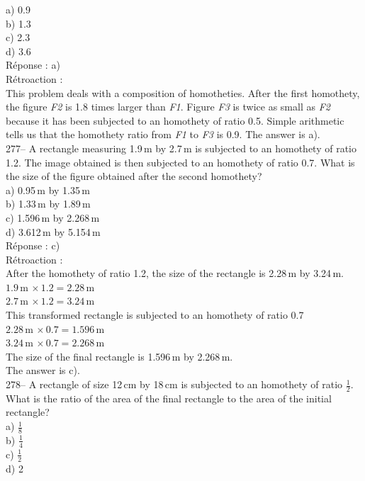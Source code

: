 \documentclass[letterpaper, 12pt]{article}
\begin{document}
a) 0.9\\
b) 1.3\\
c) 2.3\\
d) 3.6\\

R\'eponse : a)\\

R\'etroaction : \\
This problem deals with a composition of homotheties. After the
first homothety, the figure \emph{F2} is 1.8 times larger than
\emph{F1}. Figure \emph{F3} is twice as small as \emph{F2} because
it has been subjected to an homothety of ratio 0.5. Simple
arithmetic tells us that the
homothety ratio from \emph{F1} to \emph{F3} is 0.9. The answer is a).\\

277-- A rectangle measuring 1.9\,m by 2.7\,m is subjected to an
homothety of ratio 1.2. The image obtained is then subjected to an
homothety of ratio 0.7. What is the size of the figure obtained
after the second homothety?\\


a) 0.95\,m by 1.35\,m\\
b) 1.33\,m by 1.89\,m\\
c) 1.596\,m by 2.268\,m\\
d) 3.612\,m by 5.154\,m\\

R\'eponse : c)\\

R\'etroaction : \\
After the homothety of ratio 1.2, the size of the rectangle is
2.28\,m by 3.24\,m.\\
$1.9$\,m $\times\,1.2=2.28$\,m\\
$2.7$\,m $\times\,1.2=3.24$\,m\\
This transformed rectangle is subjected to an homothety of ratio
0.7\\
$2.28$\,m $\times\,0.7=1.596$\,m\\
$3.24$\,m $\times\,0.7=2.268$\,m\\
The size of the final rectangle is 1.596\,m by 2.268\,m.\\
The answer is c).\\

278-- A rectangle of size 12\,cm by 18\,cm is subjected to an
homothety of ratio $\frac{1}{2}.$ What is the ratio of the area of
the final rectangle to the area of the initial rectangle?\\

a) $\frac{1}{8}$\\[2mm]
b) $\frac{1}{4}$\\[2mm]
c) $\frac{1}{2}$\\[2mm]
d) 2\\
\end{document}
